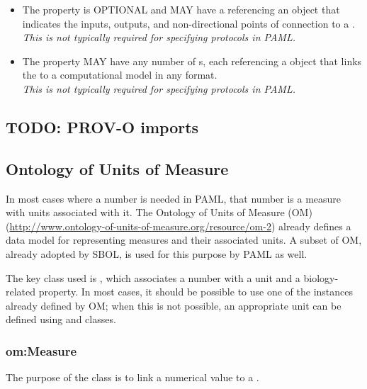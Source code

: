 \begin{itemize}
\item \label{sec:sbol:hasInterface}
The  property is OPTIONAL and MAY have a  referencing an  object that indicates the inputs, outputs, and non-directional points of connection to a .
\\{\em This is not typically required for specifying protocols in PAML.}

\item \label{sec:sbol:hasModel}
The  property MAY have any number of s, each referencing a  object that links the  to a computational model in any format.
\\{\em This is not typically required for specifying protocols in PAML.}
\end{itemize}

\subsection{TODO: PROV-O imports}

\subsection{Ontology of Units of Measure}

In most cases where a number is needed in PAML, that number is a measure with units associated with it.
The Ontology of Units of Measure (OM) (\url{http://www.ontology-of-units-of-measure.org/resource/om-2}) already defines a data model for representing measures and their associated units. 
A subset of OM, already adopted by SBOL, is used for this purpose by PAML as well.

The key class used is , which associates a number with a unit and a biology-related property.
In most cases, it should be possible to use one of the  instances already defined by OM; when this is not possible, an appropriate unit can be defined using  and  classes.

\subsubsection{om:Measure} \label{sec:om:Measure}

The purpose of the  class is to link a numerical value to a . 

